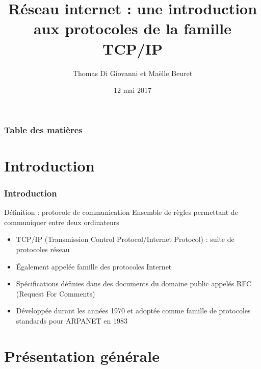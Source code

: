 \documentclass{beamer}
\title[Introduction aux protocoles TCP/IP]{
  Réseau internet : une introduction aux protocoles de la famille TCP/IP}
\author[T. Di Giovanni et M. Beuret]{Thomas Di Giovanni et Maëlle Beuret}
\institute[Université de Montpellier]{
  Faculté des Sciences - Licence informatique\\
  Université de Montpellier}
\date[12 mai 2017]{12 mai 2017}
\begin{document}
\begin{frame}
  \titlepage
\end{frame}

\begin{frame}
  \frametitle{Table des matières}
  \tableofcontents
\end{frame}

\section{Introduction}

\begin{frame}
  \frametitle{Introduction}
    \begin{block}{Définition : protocole de communication}
        Ensemble de règles permettant de communiquer entre deux ordinateurs
    \end{block}
    \begin{itemize}
        \item TCP/IP (Transmission Control Protocol/Internet Protocol) : suite de protocoles réseau
        \item Également appelée famille des protocoles Internet
        \item Spécifications définies dans des documents du domaine public appelés RFC (Request For Comments)
        \item Développée durant les années 1970 et adoptée comme famille de protocoles standards pour ARPANET en 1983
    \end{itemize}
\end{frame}

\section{Présentation générale}
\end{document}
